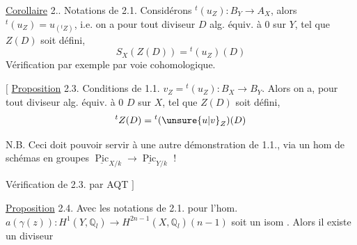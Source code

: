 \uline{Corollaire} 2.. \margin{\rule[-2.8\baselineskip]{0.45pt}{3.5\baselineskip}}Notations de 2.1. Considérons $ {}^t(u_Z):B_Y\longrightarrow A_X$, alors $ {}^t(u_Z)=u_{({}^tZ)}$, i.e. on a pour tout diviseur $D$ alg. équiv. à $0$ sur $Y$, tel que $Z(D)$ soit défini,
\[
S_X(Z(D))={}^t(u_Z)(D)
\]
Vérification par exemple par voie cohomologique.

$[$ \uline{Proposition} 2.3. Conditions de 1.1.  $v_Z={}^t(u_Z):B_X\longrightarrow B_Y$. Alors on a, pour tout diviseur alg. équiv. à $0$ $D$ sur $X$, tel que $Z(D)$ soit défini,
\[
{}^tZ(D)={}^t(\unsure{u|v}_Z)(D)
\]

N.B. Ceci doit pouvoir servir à une autre démonstration de 1.1., via un hom de schémas en groupes $\underline{\operatorname{Pic}}_{X/k}\longrightarrow\underline{\operatorname{Pic}}_{Y/k}$ !

Vérification de 2.3. par AQT $]$

\uline{Proposition} 2.4. Avec les notations de 2.1.  pour  l'hom. $a(\gamma(z)):\allowbreak H^1(Y,\mathbb Q_l)\longrightarrow H^{2n-1}(X,\mathbb Q_l)(n-1)$ soit un isom  . Alors il existe un diviseur

